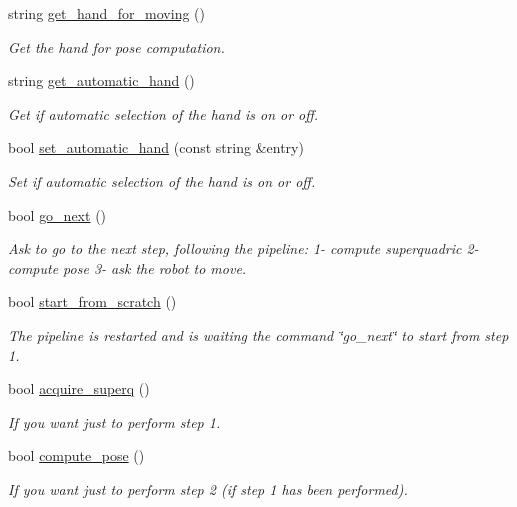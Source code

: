 \begin{DoxyCompactItemize}
string \hyperlink{classExperimentOne_a066ac71cee6dec9422f213b2a58f21ba}{get\-\_\-hand\-\_\-for\-\_\-moving} ()
\begin{DoxyCompactList}\small\item\em Get the hand for pose computation. \end{DoxyCompactList}\item 
string \hyperlink{classExperimentOne_a25eb29db579ef1d960c35bd2bc71ec36}{get\-\_\-automatic\-\_\-hand} ()
\begin{DoxyCompactList}\small\item\em Get if automatic selection of the hand is on or off. \end{DoxyCompactList}\item 
bool \hyperlink{classExperimentOne_a3bb4965701fe8b4062d974f0c75f5355}{set\-\_\-automatic\-\_\-hand} (const string \&entry)
\begin{DoxyCompactList}\small\item\em Set if automatic selection of the hand is on or off. \end{DoxyCompactList}\item 
bool \hyperlink{classExperimentOne_a6ce79bc38d0e6fc201db5576a2c9e265}{go\-\_\-next} ()
\begin{DoxyCompactList}\small\item\em Ask to go to the next step, following the pipeline\-: 1-\/ compute superquadric 2-\/ compute pose 3-\/ ask the robot to move. \end{DoxyCompactList}\item 
bool \hyperlink{classExperimentOne_ac01beb32e67fd6067c273ae505060139}{start\-\_\-from\-\_\-scratch} ()
\begin{DoxyCompactList}\small\item\em The pipeline is restarted and is waiting the command \char`\"{}go\-\_\-next\char`\"{} to start from step 1. \end{DoxyCompactList}\item 
bool \hyperlink{classExperimentOne_a28e92b0a8df58c9dfc77ddae39c642b5}{acquire\-\_\-superq} ()
\begin{DoxyCompactList}\small\item\em If you want just to perform step 1. \end{DoxyCompactList}\item 
bool \hyperlink{classExperimentOne_a39a4ec1aa004bcdc7a2b3cfb3804e59f}{compute\-\_\-pose} ()
\begin{DoxyCompactList}\small\item\em If you want just to perform step 2 (if step 1 has been performed). \end{DoxyCompactList}\item 

\end{DoxyCompactItemize}
